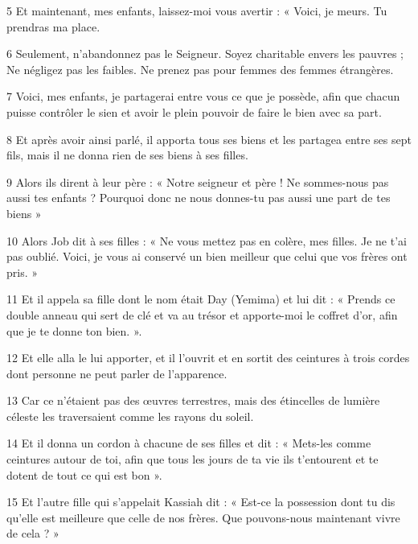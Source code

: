\par 5 Et maintenant, mes enfants, laissez-moi vous avertir : « Voici, je meurs. Tu prendras ma place.

\par 6 Seulement, n'abandonnez pas le Seigneur. Soyez charitable envers les pauvres ; Ne négligez pas les faibles. Ne prenez pas pour femmes des femmes étrangères.

\par 7 Voici, mes enfants, je partagerai entre vous ce que je possède, afin que chacun puisse contrôler le sien et avoir le plein pouvoir de faire le bien avec sa part.

\par 8 Et après avoir ainsi parlé, il apporta tous ses biens et les partagea entre ses sept fils, mais il ne donna rien de ses biens à ses filles.

\par 9 Alors ils dirent à leur père : « Notre seigneur et père ! Ne sommes-nous pas aussi tes enfants ? Pourquoi donc ne nous donnes-tu pas aussi une part de tes biens »

\par 10 Alors Job dit à ses filles : « Ne vous mettez pas en colère, mes filles. Je ne t'ai pas oublié. Voici, je vous ai conservé un bien meilleur que celui que vos frères ont pris. »

\par 11 Et il appela sa fille dont le nom était Day (Yemima) et lui dit : « Prends ce double anneau qui sert de clé et va au trésor et apporte-moi le coffret d'or, afin que je te donne ton bien. ».

\par 12 Et elle alla le lui apporter, et il l'ouvrit et en sortit des ceintures à trois cordes dont personne ne peut parler de l'apparence.

\par 13 Car ce n'étaient pas des œuvres terrestres, mais des étincelles de lumière céleste les traversaient comme les rayons du soleil.

\par 14 Et il donna un cordon à chacune de ses filles et dit : « Mets-les comme ceintures autour de toi, afin que tous les jours de ta vie ils t'entourent et te dotent de tout ce qui est bon ».

\par 15 Et l'autre fille qui s'appelait Kassiah dit : « Est-ce la possession dont tu dis qu'elle est meilleure que celle de nos frères. Que pouvons-nous maintenant vivre de cela ? »

